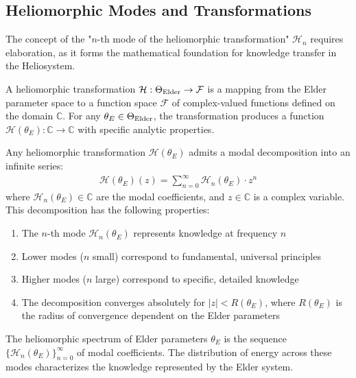 \subsection{Heliomorphic Modes and Transformations}

The concept of the "$n$-th mode of the heliomorphic transformation" $\mathcal{H}_n$ requires elaboration, as it forms the mathematical foundation for knowledge transfer in the Heliosystem.

\begin{definition}
A heliomorphic transformation $\mathcal{H}: \Theta_{\text{Elder}} \rightarrow \mathcal{F}$ is a mapping from the Elder parameter space to a function space $\mathcal{F}$ of complex-valued functions defined on the domain $\mathbb{C}$. For any $\theta_E \in \Theta_{\text{Elder}}$, the transformation produces a function $\mathcal{H}(\theta_E): \mathbb{C} \rightarrow \mathbb{C}$ with specific analytic properties.
\end{definition}

\begin{theorem}
Any heliomorphic transformation $\mathcal{H}(\theta_E)$ admits a modal decomposition into an infinite series:
\begin{align}
\mathcal{H}(\theta_E)(z) = \sum_{n=0}^{\infty} \mathcal{H}_n(\theta_E) \cdot z^n
\end{align}
where $\mathcal{H}_n(\theta_E) \in \mathbb{C}$ are the modal coefficients, and $z \in \mathbb{C}$ is a complex variable. This decomposition has the following properties:
\begin{enumerate}
    \item The $n$-th mode $\mathcal{H}_n(\theta_E)$ represents knowledge at frequency $n$
    \item Lower modes ($n$ small) correspond to fundamental, universal principles
    \item Higher modes ($n$ large) correspond to specific, detailed knowledge
    \item The decomposition converges absolutely for $|z| < R(\theta_E)$, where $R(\theta_E)$ is the radius of convergence dependent on the Elder parameters
\end{enumerate}
\end{theorem}

\begin{definition}
The heliomorphic spectrum of Elder parameters $\theta_E$ is the sequence $\{\mathcal{H}_n(\theta_E)\}_{n=0}^{\infty}$ of modal coefficients. The distribution of energy across these modes characterizes the knowledge represented by the Elder system.
\end{definition}

